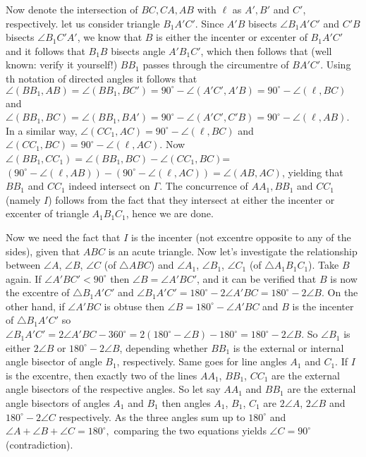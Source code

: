 \documentclass[11pt,a4paper]{article}
\begin{document}
\begin{enumerate}
	Now denote the intersection of $BC, CA, AB$ with $\ell$ as $A',B'$ and $C'$, respectively. let us consider triangle $B_1A'C'$. Since $A'B$ bisects $\angle B_1A'C'$ and $C'B$ bisects $\angle B_1C'A'$, we know that $B$ is either the incenter or excenter of $B_1A'C'$ and it follows that $B_1B$ bisects angle $A'B_1C'$, which then follows that (well known: verify it yourself!) $BB_1$ passes through the circumentre of $BA'C'$. Using th notation of directed angles it follows that $\angle (BB_1,AB)=\angle (BB_1,BC')=90^{\circ}-\angle (A'C',A'B)=90^{\circ}-\angle (\ell, BC)$ and $\angle (BB_1,BC)=\angle (BB_1,BA')=90^{\circ}-\angle (A'C',C'B)=90^{\circ}-\angle (\ell,AB)$. In a similar way, $\angle (CC_1,AC)=90^{\circ}-\angle (\ell, BC)$ and $\angle (CC_1,BC)=90^{\circ}-\angle (\ell, AC).$ Now $\angle (BB_1,CC_1)=\angle (BB_1, BC)-\angle (CC_1, BC)$=$(90^{\circ}-\angle (\ell,AB))-(90^{\circ}-\angle (\ell,AC))=\angle (AB, AC)$, yielding that $BB_1$ and $CC_1$ indeed intersect on $\Gamma$. The concurrence of $AA_1, BB_1$ and $CC_1$ (namely $I$) follows from the fact that they intersect at either the incenter or excenter of triangle $A_1B_1C_1$, hence we are done.
	
	Now we need the fact that $I$ is the incenter (not excentre opposite to any of the sides), given that $ABC$ is an acute triangle. Now let's investigate the relationship between $\angle A$, $\angle B$, $\angle C$ (of $\triangle ABC$) and $\angle A_1$, $\angle B_1$, $\angle C_1$ (of $\triangle A_1B_1C_1$). Take $B$ again. If $\angle A'BC'<90^{\circ}$ then $\angle B=\angle A'BC'$, and it can be verified that $B$ is now the excentre of $\triangle B_1A'C'$ and $\angle B_1A'C'=180^{\circ}-2\angle A'BC=180^{\circ}-2\angle B$. On the other hand, if $\angle A'BC$ is obtuse then $\angle B=180^{\circ}-\angle A'BC$ and $B$ is the incenter of $\triangle B_1A'C'$ so $\angle B_1A'C'=2\angle A'BC-360^{\circ}=2(180^{\circ}-\angle B)-180^{\circ}=180^{\circ}-2\angle B.$ So $\angle B_1$ is either $2\angle B$ or $180^{\circ}-2\angle B$, depending whether $BB_1$ is the external or internal angle bisector of angle $B_1$, respectively. Same goes for line angles $A_1$ and $C_1$. If $I$ is the excentre, then exactly two of the lines $AA_1$, $BB_1$, $CC_1$ are the external angle bisectors of the respective angles. So let say $AA_1$ and $BB_1$ are the external angle bisectors of angles $A_1$ and $B_1$ then angles $A_1$, $B_1$, $C_1$ are $2\angle A$, $2\angle B$ and $180^{\circ}-2\angle C$ respectively. As the three angles sum up to $180^{\circ}$ and $\angle A+\angle B+\angle C=180^{\circ},$ comparing the two equations yields $\angle C=90^{\circ}$ (contradiction).
	

\end{enumerate}
\end{document}
